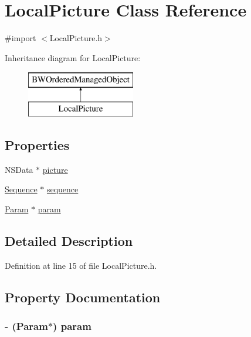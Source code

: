 \hypertarget{interface_local_picture}{
\section{LocalPicture Class Reference}
\label{interface_local_picture}
}


{\ttfamily \#import $<$LocalPicture.h$>$}

Inheritance diagram for LocalPicture:\begin{figure}[H]
\begin{center}
\leavevmode
\includegraphics[height=2.000000cm]{interface_local_picture}
\end{center}
\end{figure}
\subsection*{Properties}
\begin{DoxyCompactItemize}
\item 
NSData $\ast$ \hyperlink{interface_local_picture_a757efbf7fad3c9e42f975cbaa4d8a7a5}{picture}
\item 
\hyperlink{interface_sequence}{Sequence} $\ast$ \hyperlink{interface_local_picture_a17f2837cead21bb5f65fb4cda2845b21}{sequence}
\item 
\hyperlink{interface_param}{Param} $\ast$ \hyperlink{interface_local_picture_afbb8ad4b0ed6279dec19e67fbd9c94b1}{param}
\end{DoxyCompactItemize}


\subsection{Detailed Description}


Definition at line 15 of file LocalPicture.h.



\subsection{Property Documentation}
\hypertarget{interface_local_picture_afbb8ad4b0ed6279dec19e67fbd9c94b1}{
\subsubsection[{param}]{\setlength{\rightskip}{0pt plus 5cm}-\/ ({\bf Param}$\ast$) param}}
\label{interface_local_picture_afbb8ad4b0ed6279dec19e67fbd9c94b1}


